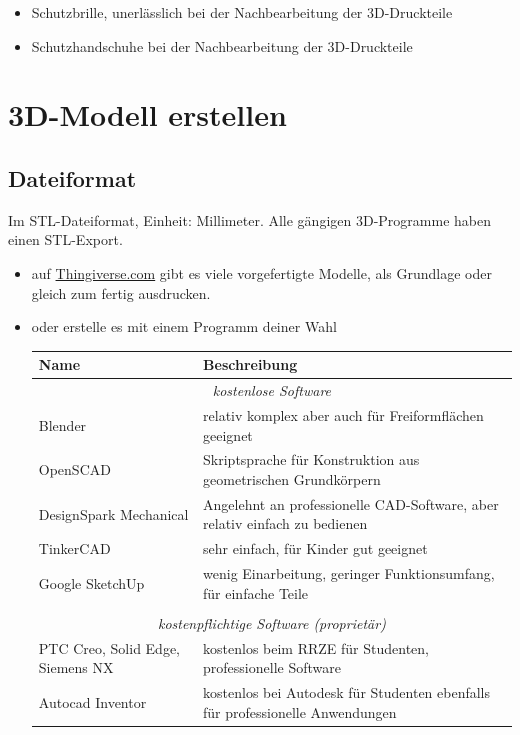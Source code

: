 \documentclass{\basedir/fablab-document}
\begin{document}
\begin{itemize}
	\item Schutzbrille, unerlässlich bei der Nachbearbeitung der 3D-Druckteile \\
	\item Schutzhandschuhe bei der Nachbearbeitung der 3D-Druckteile\\
\end{itemize}
	\newpage

	
	\renewcommand{\contentsname}{Inhaltsverzeichnis / Arbeitsablauf}
	\setcounter{tocdepth}{2}
	\tableofcontents
	\newpage
	
	\section{3D-Modell erstellen}
	\subsection{Dateiformat}
	
	Im STL-Dateiformat, Einheit: Millimeter. Alle gängigen 3D-Programme haben einen STL-Export.
	
	\begin{itemize}
		\item auf \href{https://thingiverse.com}{Thingiverse.com} gibt es viele vorgefertigte Modelle, als
		Grundlage oder gleich zum fertig ausdrucken.
		\item oder erstelle es mit einem Programm deiner Wahl
		\begin{table}[H]
			\centering
			\begin{tabularx}{\textwidth}{|l|X|}
				\hline \textbf{Name} & \textbf{Beschreibung} \\
				\hline \multicolumn{2}{|c|}{\textit{kostenlose Software}}  \\
				\hline Blender & relativ komplex aber auch für Freiformflächen geeignet  \\
				\hline OpenSCAD & Skriptsprache für Konstruktion aus geometrischen Grundkörpern \\
				\hline DesignSpark Mechanical & Angelehnt an professionelle CAD-Software, aber relativ einfach zu bedienen  \\
				\hline TinkerCAD & sehr einfach, für Kinder gut geeignet  \\
				\hline Google SketchUp & wenig Einarbeitung, geringer Funktionsumfang, für einfache Teile \\
				\hline & \\
				\hline \multicolumn{2}{|c|}{\textit{kostenpflichtige Software (proprietär)}}  \\
				\hline PTC Creo, Solid Edge, Siemens NX & kostenlos beim RRZE für Studenten, professionelle Software \\
				\hline Autocad Inventor & kostenlos bei Autodesk für Studenten ebenfalls für professionelle Anwendungen \\
				\hline
			\end{tabularx}
		\end{table}
	\end{itemize}
	
\end{document}
